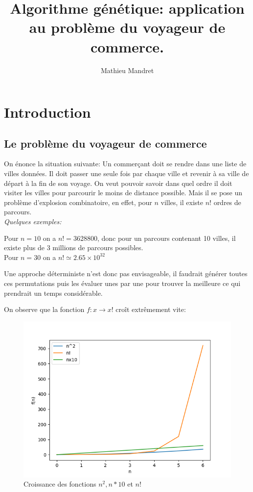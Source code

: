 \documentclass[11pt]{article}
\author{Mathieu Mandret}
\date{}
\title{Algorithme génétique: application au problème du voyageur de commerce.}
\begin{document}
\maketitle
\tableofcontents



\section{Introduction}
\label{sec-1}
\subsection{Le problème du voyageur de commerce}
\label{sec-1-1}
On énonce la situation suivante:
Un commerçant doit se rendre dans une liste de villes données. Il doit passer une seule fois par chaque ville
et revenir à sa ville de départ à la fin de son voyage.
On veut pouvoir savoir dans quel ordre il doit visiter les villes pour parcourir le moins de distance possible.
Mais il se pose un problème d'explosion combinatoire, en effet, pour $n$ villes, il existe $n!$ ordres de parcours. \\
\emph{Quelques exemples:} 

Pour $n = 10$ on a $n! = 3628800$, donc pour un parcours contenant 10 villes, il existe plus de 3 millions de parcours possibles. \\

Pour $n = 30$ on a $n! \simeq 2.65 \times 10^{32}$

Une approche déterministe n'est donc pas envisageable, il faudrait générer toutes ces permutations puis les évaluer unes
par une pour trouver la meilleure ce qui prendrait un temps considérable. 

On observe que la fonction $f: x \rightarrow x!$ croît extrêmement vite:

\begin{figure}[htb]
\centering
\includegraphics[width=.9\linewidth]{./complexite.png}
\caption{Croissance des fonctions $n^2, n*10$ et $n!$}
\end{figure}
\end{document}
